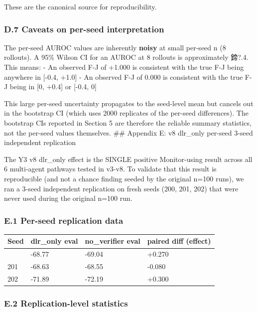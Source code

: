 \documentclass[
]{article}
\newcounter{none} %
\begin{document}
These are the canonical source for reproducibility.

\subsubsection{D.7 Caveats on per-seed
interpretation}\label{d.7-caveats-on-per-seed-interpretation}

The per-seed AUROC values are inherently \textbf{noisy} at small
per-seed n (8 rollouts). A 95\% Wilson CI for an AUROC at 8 rollouts is
approximately 鍗?.4. This means: - An observed F-J of +1.000 is
consistent with the true F-J being anywhere in {[}-0.4, +1.0{]} - An
observed F-J of 0.000 is consistent with the true F-J being in {[}0,
+0.4{]} or {[}-0.4, 0{]}

This large per-seed uncertainty propagates to the seed-level mean but
cancels out in the bootstrap CI (which uses 2000 replicates of the
per-seed differences). The bootstrap CIs reported in Section 5 are
therefore the reliable summary statistics, not the per-seed values
themselves. \#\# Appendix E: v8 dlr\_only per-seed 3-seed independent
replication

The Y3 v8 dlr\_only effect is the SINGLE positive Monitor-using result
across all 6 multi-agent pathways tested in v3-v8. To validate that this
result is reproducible (and not a chance finding seeded by the original
n=100 runs), we ran a 3-seed independent replication on fresh seeds
(200, 201, 202) that were never used during the original n=100 run.

\subsubsection{E.1 Per-seed replication
data}\label{e.1-per-seed-replication-data}

{\def\LTcaptype{none} %
\begin{longtable}[]{@{}llll@{}}
\toprule\noalign{}
Seed & dlr\_only eval & no\_verifier eval & paired diff (effect) \\
\midrule\noalign{}
\endhead
\bottomrule\noalign{}
\endlastfoot
200 & -68.77 & -69.04 & +0.270 \\
201 & -68.63 & -68.55 & -0.080 \\
202 & -71.89 & -72.19 & +0.300 \\
\end{longtable}
}

\subsubsection{E.2 Replication-level
statistics}\label{e.2-replication-level-statistics}
\end{document}
